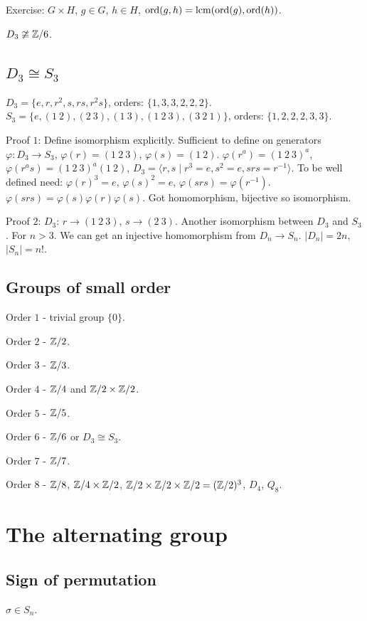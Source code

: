 \documentclass[10pt, a4paper]{article}
\begin{document}
Exercise:
$G \times H$,
$g \in G$,
$h \in H$,
$\operatorname{ord}(g, h) = \operatorname{lcm}(\operatorname{ord}(g), \operatorname{ord}(h))$.

$D_3 \ncong \mathbb{Z} / 6$.

\subsection{\texorpdfstring{$D_3 \cong S_3$}{}}
$D_3 = \{e, r, r ^ 2, s, rs, r ^ 2s\}$,
orders:
$\{1, 3, 3, 2, 2, 2\}$.
$S_3 = \{e, (1\ 2), (2\ 3), (1\ 3), (1\ 2\ 3), (3\ 2\ 1)\}$,
orders:
$\{1, 2, 2, 2, 3, 3\}$.

Proof $1$:
Define isomorphism explicitly.
Sufficient to define on generators $\varphi : D_3 \to S_3$,
$\varphi(r) = (1\ 2\ 3)$,
$\varphi(s) = (1\ 2)$.
$\varphi(r ^ a) = (1\ 2\ 3) ^ a$,
$\varphi(r ^ as) = (1\ 2\ 3) ^ a(1\ 2)$,
$D_3 = \langle r, s \mid r ^ 3 = e, s ^ 2 = e, srs = r ^ {-1}\rangle$.
To be well defined need:
$\varphi(r) ^ 3 = e$,
$\varphi(s) ^ 2 = e$,
$\varphi(srs) = \varphi(r ^ {-1})$.
$\varphi(srs) = \varphi(s)\varphi(r)\varphi(s)$.
Got homomorphism,
bijective so isomorphism.

Proof $2$:
$D_3$:
$r \to (1\ 2\ 3)$,
$s \to (2\ 3)$.
Another isomorphism between $D_3$ and $S_3$.
For $n > 3$.
We can get an injective homomorphism from $D_n \to S_n$.
$|D_n| = 2n$,
$|S_n| = n!$.

\subsection{Groups of small order}
Order $1$ -
trivial group $\{0\}$.

Order $2$ -
$\mathbb{Z} / 2$.

Order $3$ -
$\mathbb{Z} / 3$.

Order $4$ -
$\mathbb{Z} / 4$ and $\mathbb{Z} / 2 \times \mathbb{Z} / 2$.

Order $5$ -
$\mathbb{Z} / 5$.

Order $6$ -
$\mathbb{Z} / 6$ or $D_3 \cong S_3$.

Order $7$ -
$\mathbb{Z} / 7$.

Order $8$ -
$\mathbb{Z} / 8$,
$\mathbb{Z} / 4 \times \mathbb{Z} / 2$,
$\mathbb{Z} / 2 \times \mathbb{Z} / 2 \times \mathbb{Z} / 2 = (\mathbb{Z} / 2) ^ 3$,
$D_4$,
$Q_8$.

\newpage

\section{The alternating group}

\subsection{Sign of permutation}
$\sigma \in S_n$.
\end{document}

